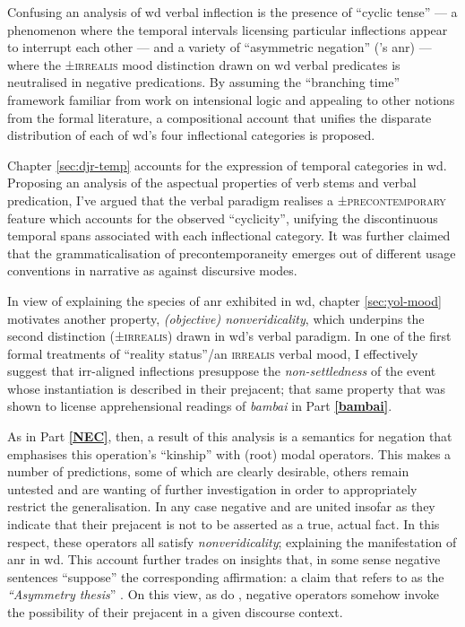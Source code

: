 \documentclass[11pt,dvipsnames]{report}
\begin{document}
 Confusing an analysis of \acrshort{wd} verbal inflection is the presence of ``cyclic tense'' --- a phenomenon where the temporal intervals licensing particular inflections appear to interrupt each other --- and a variety of ``asymmetric negation'' (\citeauthor{Miestamo2005}'s \acrshort{anr}) --- where the ±\textsc{irrealis} mood distinction drawn on \acrshort{wd} verbal predicates is neutralised in negative predications.
By assuming the ``branching time'' framework familiar from work on intensional logic and appealing to other notions from the formal literature, a compositional account that unifies the disparate distribution of each of \acrshort{wd}'s four inflectional categories is proposed.

Chapter \ref{sec:djr-temp} accounts for the expression of temporal categories in \acrshort{wd}. Proposing an analysis of the aspectual properties of verb stems and verbal predication, I've argued that the verbal paradigm realises a ±\textsc{precontemporary} feature which accounts for the observed ``cyclicity'', unifying the discontinuous temporal spans associated with each inflectional category. It was further claimed that the grammaticalisation of precontemporaneity emerges out of different usage conventions in narrative as against discursive modes.
 
In view of explaining the species of \acrshort{anr} exhibited in \acrshort{wd}, chapter \ref{sec:yol-mood} motivates another property, \textit{(objective) nonveridicality}, which underpins the second distinction (±\textsc{irrealis}) drawn in \acrshort{wd}'s verbal paradigm. In one of the first formal treatments of ``reality status''/an \textsc{irrealis} verbal mood, I effectively suggest that \gls{irr}-aligned inflections presuppose the \textit{non-settledness} of the event whose instantiation is described in their prejacent; that same property that was shown to license apprehensional readings of \textit{bambai} in Part \textbf{\ref{bambai}}.

As in Part \textbf{\ref{NEC}}, then, a result of this analysis is a semantics for negation that emphasises this operation's ``kinship'' with (root) modal operators. This makes a number of predictions, some of which are clearly desirable, others remain untested and are wanting of further investigation in order to appropriately restrict the generalisation. In any case negative and  are united insofar as they indicate that their prejacent is not to be asserted as a true, actual fact. In this respect, these operators all satisfy \textit{nonveridicality}; explaining the manifestation of \acrshort{anr} in \acrshort{wd}. This account further trades on insights that, in some sense negative sentences ``suppose'' the corresponding affirmation: a claim that \citeauthor{Horn2001} refers to as the \textit{``Asymmetry thesis}'' \citeyearpar[\S{}]{Horn2001}. On this view, as do , negative operators somehow invoke the possibility of their prejacent in a given discourse context.
\end{document}
